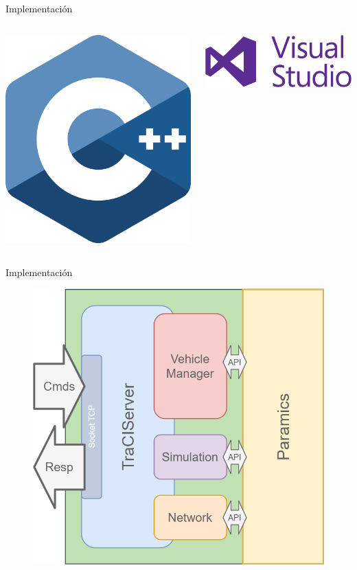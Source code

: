 \documentclass[aspectratio=169]{beamer}
\begin{document}
\begin{frame}{Implementación}
\begin{columns}
    \begin{column}{.5\linewidth}
        \centering
        \includegraphics[width=.5\linewidth]{figuras/c++.png}
    \end{column}
    \begin{column}{.5\linewidth}
        \centering
        \includegraphics[width=.8\linewidth]{figuras/VisualStudio.png}
    \end{column}
\end{columns}
\end{frame}

\begin{frame}{Implementación}
\begin{figure}
    \centering
    \includegraphics[width=.50\linewidth]{figuras/modules_pveins.png}
\end{figure}
\end{frame}
\end{document}
